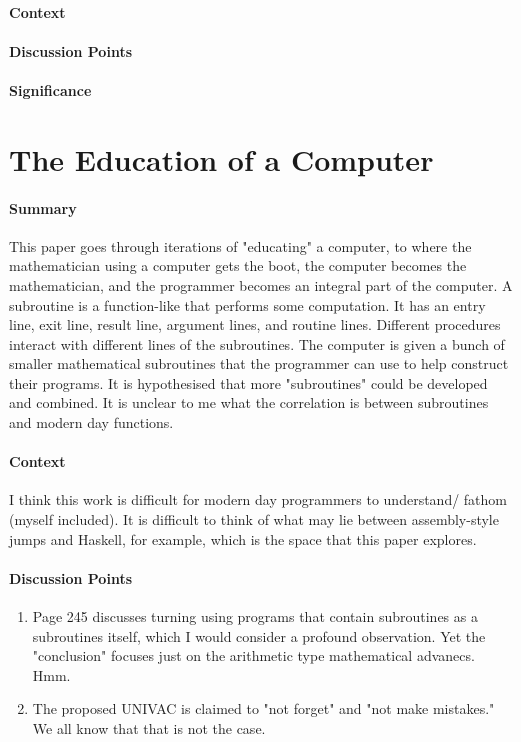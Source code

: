 \paragraph{\textbf{Context}}
\paragraph{\textbf{Discussion Points}}
\paragraph{\textbf{Significance}}

\section {The Education of a Computer \cite{hopper1952education}}

\paragraph{\textbf{Summary}}
This paper goes through iterations of "educating" a computer, to where the
mathematician using a computer gets the boot, the computer becomes the
mathematician, and the programmer becomes an integral part of the computer. A
subroutine is a function-like that performs some computation. It has an entry
line, exit line, result line, argument lines, and routine lines. Different
procedures interact with different lines of the subroutines. The computer is
given a bunch of smaller mathematical subroutines that the programmer can use to
help construct their programs. It is hypothesised that more "subroutines" could
be developed and combined. It is unclear to me what the correlation is between
subroutines and modern day functions.
\paragraph{\textbf{Context}}
I think this work is difficult for modern day programmers to understand/ fathom
(myself included). It is difficult to think of what may lie between
assembly-style jumps and Haskell, for example, which is the space that this
paper explores.
\paragraph{\textbf{Discussion Points}}
\begin{enumerate}
    \item Page 245 discusses turning using programs that contain subroutines as
    a subroutines itself, which I would consider a profound observation. Yet the
    "conclusion" focuses just on the arithmetic type mathematical advanecs. Hmm.
    \item The proposed UNIVAC is claimed to "not forget" and "not make
    mistakes." We all know that that is not the case.
\end{enumerate}


